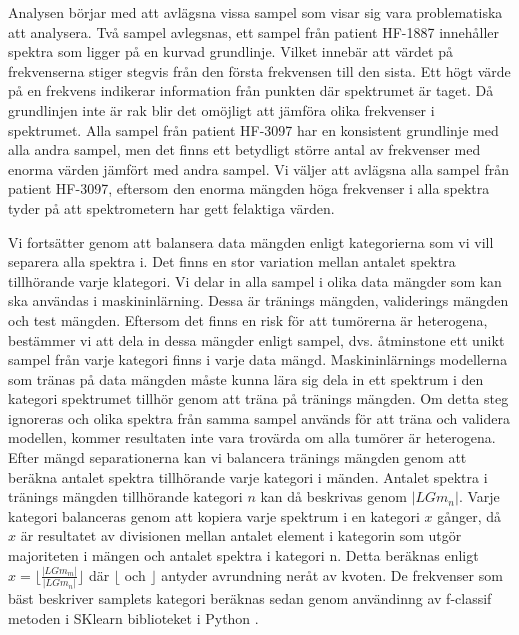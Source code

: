 Analysen börjar med att avlägsna vissa sampel som visar sig vara problematiska att analysera. Två sampel avlegsnas, ett sampel från patient HF-1887 innehåller spektra som ligger på en kurvad grundlinje. Vilket innebär att värdet på frekvenserna stiger stegvis från den första frekvensen till den sista. Ett högt värde på en frekvens indikerar information från punkten där spektrumet är taget. Då grundlinjen inte är rak blir det omöjligt att jämföra olika frekvenser i spektrumet. Alla sampel från patient HF-3097 har en konsistent grundlinje med alla andra sampel, men det finns ett betydligt större antal av frekvenser med enorma värden jämfört med andra sampel. Vi väljer att avlägsna alla sampel från patient HF-3097, eftersom den enorma mängden höga frekvenser i alla spektra tyder på att spektrometern har gett felaktiga värden.

Vi fortsätter genom att balansera data mängden enligt kategorierna som vi vill separera alla spektra i. Det finns en stor variation mellan antalet spektra tillhörande varje klategori. Vi delar in alla sampel i olika data mängder som kan ska användas i maskininlärning. Dessa är tränings mängden, validerings mängden och test mängden. Eftersom det finns en risk för att tumörerna är heterogena, bestämmer vi att dela in dessa mängder enligt sampel, dvs. åtminstone ett unikt sampel från varje kategori finns i varje data mängd. Maskininlärnings modellerna som tränas på data mängden måste kunna lära sig dela in ett spektrum i den kategori spektrumet tillhör genom att träna på tränings mängden. Om detta steg ignoreras och olika spektra från samma sampel används för att träna och validera modellen, kommer resultaten inte vara trovärda om alla tumörer är heterogena. Efter mängd separationerna kan vi balancera tränings mängden genom att beräkna antalet spektra tillhörande varje kategori i mänden. Antalet spektra i tränings mängden tillhörande kategori $n$ kan då beskrivas genom $|LGm_n|$. Varje kategori balanceras genom att kopiera varje spektrum i en kategori $x$ gånger, då $x$ är resultatet av divisionen mellan antalet element i kategorin som utgör majoriteten i mängen och antalet spektra i kategori n. Detta beräknas enligt $x = \lfloor \frac{|LGm_m|}{|LGm_n|} \rfloor$ där $\lfloor$ och $\rfloor$ antyder avrundning neråt av kvoten. De frekvenser som bäst beskriver samplets kategori beräknas sedan genom användinng av f-classif metoden i SKlearn biblioteket i Python \cite{scikit}.

